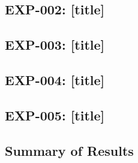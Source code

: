 \subsection{EXP-002: [title]}
\label{sec:results-exp002}

\subsection{EXP-003: [title]}
\label{sec:results-exp003}

\subsection{EXP-004: [title]}
\label{sec:results-exp004}

\subsection{EXP-005: [title]}
\label{sec:results-exp005}

\subsection{Summary of Results}
\label{sec:results-summary}
